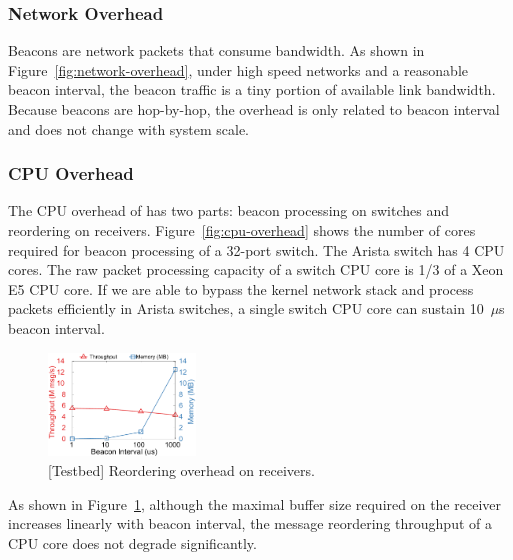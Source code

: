 

\subsubsection{Network Overhead}
\label{sec:eval-overhead}


Beacons are network packets that consume bandwidth.
As shown in Figure~\ref{fig:network-overhead}, under high speed networks and a reasonable beacon interval, the beacon traffic is a tiny portion of available link bandwidth. Because beacons are hop-by-hop, the overhead is only related to beacon interval and does not change with system scale.

\subsubsection{CPU Overhead}
\label{sec:eval-cpu-overhead}

The CPU overhead of \sys has two parts: beacon processing on switches and reordering on receivers.
Figure~\ref{fig:cpu-overhead} shows the number of cores required for beacon processing of a 32-port switch. The Arista switch has 4 CPU cores. The raw packet processing capacity of a switch CPU core is 1/3 of a Xeon E5 CPU core. If we are able to bypass the kernel network stack and process packets efficiently in Arista switches, a single switch CPU core can sustain 10~$\mu$s beacon interval.


\begin{figure}[t]
\centering
\includegraphics[width=0.35\textwidth]{gnuplot/reorder_receiver.pdf}
\caption{[Testbed] Reordering overhead on receivers.}
\label{fig:reorder-overhead}
\end{figure}

As shown in Figure~\ref{fig:reorder-overhead}, although the maximal buffer size required on the receiver increases linearly with beacon interval, the message reordering throughput of a CPU core does not degrade significantly.

